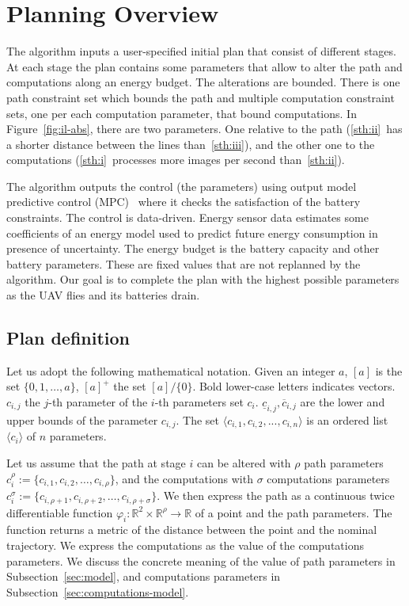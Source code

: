 \documentclass[letterpaper,10pt,conference]{ieeeconf}
\theoremstyle{definition}
\begin{document}
\section{Planning Overview}  %
\label{sec:prob}             %
The algorithm inputs a user-specified initial plan that consist of different stages. At each stage the plan contains some parameters that allow to alter the path and computations along an energy budget. The alterations are bounded. There is one path constraint set which bounds the path and multiple computation constraint sets, one per each computation parameter, that bound computations. In Figure~\ref{fig:il-abs}, there are two parameters. One relative to the path (\ref{sth:ii}~has a shorter distance between the lines than~\ref{sth:iii}), and the other one to the computations (\ref{sth:i}~processes more images per second than~\ref{sth:ii}). 

The algorithm outputs the control (the parameters) using output model predictive control (MPC)~\cite{rawlings2017model} where it checks the satisfaction of the battery constraints. The control is data-driven. Energy sensor data estimates some coefficients of an energy model used to predict future energy consumption in presence of uncertainty. The energy budget is the battery capacity and other battery parameters. These are fixed values that are not replanned by the algorithm. Our goal is to complete the plan with the highest possible parameters as the UAV flies and its batteries drain. 

\subsection{Plan definition}
\label{sec:prelim}

Let us adopt the following mathematical notation. Given an integer $a$, $[a]$ is the set $\{0,1,\dots,a\}$, $[a]^+$ the set $[a]/\{0\}$. Bold lower-case letters indicates vectors. $c_{i,j}$ the $j$-th parameter of the $i$-th parameters set $c_i$. $\underline{c}_{i,j},\overline{c}_{i,j}$ are the lower and upper bounds of the parameter $c_{i,j}$. The set $\langle c_{i,1},c_{i,2},...,c_{i,n}\rangle$ is an ordered list $\langle c_i \rangle$ of $n$ parameters.

Let us assume that the path at stage $i$ can be altered with $\rho$ path parameters $c_i^\rho:=\{c_{i,1},c_{i,2},\dots,c_{i,\rho}\}$, and the computations with $\sigma$ computations parameters $c_i^\sigma:=\{c_{i,\rho+1},c_{i,\rho+2},\dots,c_{i,\rho+\sigma}\}$. We then express the path as a continuous twice differentiable function $\varphi_i:\mathbb{R}^2\times\mathbb{R}^\rho\rightarrow\mathbb{R}$ of a point and the path parameters. The function returns a metric of the distance between the point and the nominal trajectory. We express the computations as the value of the computations parameters. We discuss the concrete meaning of the value of path parameters in Subsection~\ref{sec:model}, and computations parameters in Subsection~\ref{sec:computations-model}.
\end{document}
